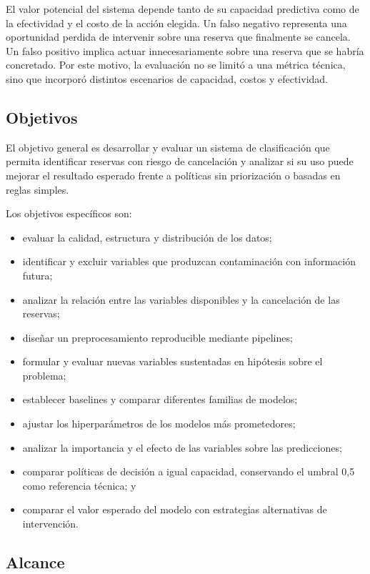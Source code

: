 El valor potencial del sistema depende tanto de su capacidad predictiva como
de la efectividad y el costo de la acción elegida. Un falso negativo representa
una oportunidad perdida de intervenir sobre una reserva que finalmente se
cancela. Un falso positivo implica actuar innecesariamente sobre una reserva
que se habría concretado. Por este motivo, la evaluación no se limitó a una
métrica técnica, sino que incorporó distintos escenarios de capacidad,
costos y efectividad.

\subsection{Objetivos}

El objetivo general es desarrollar y evaluar un sistema de clasificación que
permita identificar reservas con riesgo de cancelación y analizar si su uso
puede mejorar el resultado esperado frente a políticas sin priorización o
basadas en reglas simples.

Los objetivos específicos son:

\begin{itemize}
    \item evaluar la calidad, estructura y distribución de los datos;
    \item identificar y excluir variables que produzcan contaminación con
    información futura;
    \item analizar la relación entre las variables disponibles y la
    cancelación de las reservas;
    \item diseñar un preprocesamiento reproducible mediante pipelines;
    \item formular y evaluar nuevas variables sustentadas en hipótesis sobre
    el problema;
    \item establecer baselines y comparar diferentes familias de modelos;
    \item ajustar los hiperparámetros de los modelos más prometedores;
    \item analizar la importancia y el efecto de las variables sobre las
    predicciones;
    \item comparar políticas de decisión a igual capacidad, conservando el
    umbral 0,5 como referencia técnica; y
    \item comparar el valor esperado del modelo con estrategias alternativas
    de intervención.
\end{itemize}

\subsection{Alcance}

